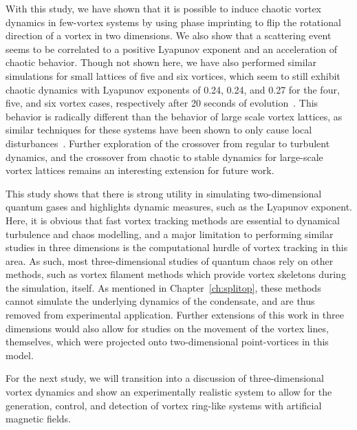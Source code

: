 With this study, we have shown that it is possible to induce chaotic vortex dynamics in few-vortex systems by using phase imprinting to flip the rotational direction of a vortex in two dimensions.
We also show that a scattering event seems to be correlated to a positive Lyapunov exponent and an acceleration of chaotic behavior.
Though not shown here, we have also performed similar simulations for small lattices of five and six vortices, which seem to still exhibit chaotic dynamics with Lyapunov exponents of 0.24, 0.24, and 0.27 for the four, five, and six vortex cases, respectively after 20 seconds of evolution~\cite{zhang2017}.
This behavior is radically different than the behavior of large scale vortex lattices, as similar techniques for these systems have been shown to only cause local disturbances~\cite{o2016topo}.
Further exploration of the crossover from regular to turbulent dynamics, and the crossover from chaotic to stable dynamics for large-scale vortex lattices remains an interesting extension for future work.

This study shows that there is strong utility in simulating two-dimensional quantum gases and highlights dynamic measures, such as the Lyapunov exponent.
Here, it is obvious that fast vortex tracking methods are essential to dynamical turbulence and chaos modelling, and a major limitation to performing similar studies in three dimensions is the computational hurdle of vortex tracking in this area.
As such, most three-dimensional studies of quantum chaos rely on other methods, such as vortex filament methods which provide vortex skeletons during the simulation, itself.
As mentioned in Chapter~\ref{ch:splitop}, these methods cannot simulate the underlying dynamics of the condensate, and are thus removed from experimental application.
Further extensions of this work in three dimensions would also allow for studies on the movement of the vortex lines, themselves, which were projected onto two-dimensional point-vortices in this model.

For the next study, we will transition into a discussion of three-dimensional vortex dynamics and show an experimentally realistic system to allow for the generation, control, and detection of vortex ring-like systems with artificial magnetic fields.


